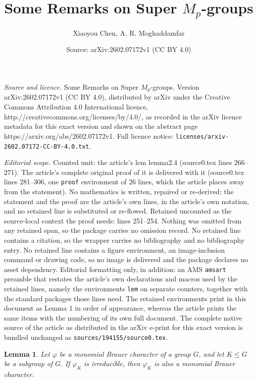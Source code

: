 \documentclass[10pt,a4paper]{amsart}
\title{Some Remarks on Super $M_{p}$-groups}
\author{Xiaoyou Chen, A. R. Moghaddamfar}
\date{Source: arXiv:2602.07172v1 (CC BY 4.0)}
\newtheorem{lem}{Lemma}
\begin{document}
\maketitle

\noindent\emph{Source and licence.} Some Remarks on Super $M_{p}$-groups. Version arXiv:2602.07172v1 (CC BY 4.0), distributed by arXiv under the Creative Commons Attribution 4.0 International licence, http://creativecommons.org/licenses/by/4.0/, as recorded in the arXiv licence metadata for this exact version and shown on the abstract page https://arxiv.org/abs/2602.07172v1. Full licence notice: \texttt{licenses/arxiv-2602.07172-CC-BY-4.0.txt}.\par\smallskip

\noindent\textit{Editorial scope.} Counted unit: the article's lem lemma2.4 (source0.tex lines 266--271). The article's complete original proof of it is delivered with it (source0.tex lines 281--306, one \texttt{proof} environment of 26 lines, which the article places away from the statement). No mathematics is written, repaired or re-derived: the statement and the proof are the article's own lines, in the article's own notation, and no retained line is substituted or re-flowed.  Retained uncounted as the source-local context the proof needs: lines 251--254.  Nothing was omitted from any retained span, so the package carries no omission record.  No retained line contains a citation, so the wrapper carries no bibliography and no bibliography entry.  No retained line contains a figure environment, an image-inclusion command or drawing code, so no image is delivered and the package declares no asset dependency.  Editorial formatting only, in addition: an AMS \texttt{amsart} preamble that restates the article's own declarations and macros used by the retained lines, namely the environments \texttt{lem} on separate counters, together with the standard packages those lines need.  The retained environments print in this document as Lemma 1 in order of appearance, whereas the article prints the same items with the numbering of its own full document.  The complete native source of the article as distributed in the arXiv e-print for this exact version is bundled unchanged as \texttt{sources/194155/source0.tex}.
\begin{lem}\label{lemma2.3}
Let $\varphi$ be a monomial Brauer character of a group $G$, and let $K\leq G$ be a subgroup of $G$.
If $\varphi_{K}$ is irreducible, then $\varphi_{K}$ is also a monomial Brauer character.
\end{lem}
\end{document}
